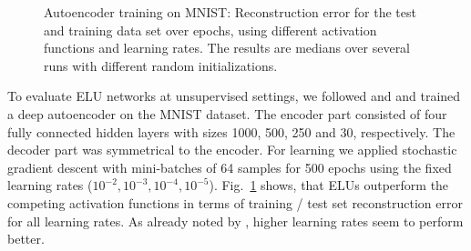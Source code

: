 \documentclass{article}
\begin{document}
\begin{figure}[!ht]
\begin{center}
\end{center}
\caption{Autoencoder training on MNIST: Reconstruction error for the test and training  data set over
epochs, using different activation functions and learning rates. The results are medians
over several runs with different random initializations.
\label{fig:mnistAuto}}
\end{figure}




To evaluate ELU networks at unsupervised settings, we followed
\citet{Martens:10} and \citet{Desjardins:15} and trained a
deep autoencoder on the MNIST dataset.
The encoder part consisted of four
fully connected hidden layers with sizes 1000, 500, 250 and 30, respectively.
The decoder part was symmetrical to the encoder.
For learning we applied stochastic gradient descent with mini-batches of 64 samples for 500 epochs
using the fixed learning rates ($10^{-2}, 10^{-3}, 10^{-4}, 10^{-5}$).
Fig.~\ref{fig:mnistAuto} shows, that ELUs outperform the competing
activation functions in terms of training / test set reconstruction error for all learning rates.
As already noted by \citet{Desjardins:15}, higher learning rates
seem to perform better.
\end{document}
